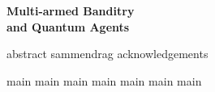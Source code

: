 \documentclass[
    12pt,
    a4paper,
    toc=listof,
    listof=totoc,
    listof=entryprefix,
    egregdoesnotlikesansseriftitles,
    titlepage=true,
]{scrbook}
\begin{document}
\begin{titlepage}
    \centering
    \vspace*{7cm}
    \Huge
    \textbf{Multi-armed Banditry \\ and Quantum Agents}
\end{titlepage}

\frontmatter
\addtocounter{tocdepth}{-1}
\tableofcontents


{abstract}
{sammendrag}
{acknowledgements}


\mainmatter
\cleardoublepage

{main}
{main}
{main}
{main}
{main}
{main}
{main}

\backmatter
\printbibliography[
    heading=bibintoc,
    title={References}
]

\cleardoublepage
\listoffigures

\cleardoublepage
\listoftables
\end{document}
